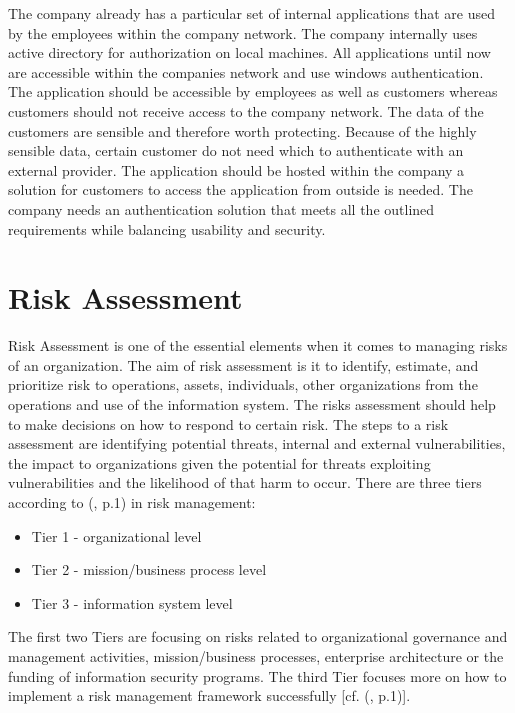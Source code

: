 The company already has a particular set of internal applications that are used by the employees within the company network. The company internally uses active directory for authorization on local machines. All applications until now are accessible within the companies network and use windows authentication. The application should be accessible by employees as well as customers whereas customers should not receive access to the company network. The data of the customers are sensible and therefore worth protecting. Because of the highly sensible data, certain customer do not need which to authenticate with an external provider. The application should be hosted within the company a solution for customers to access the application from outside is needed. The company needs an authentication solution that meets all the outlined requirements while balancing usability and security. 


\section{Risk Assessment}

Risk Assessment is one of the essential elements when it comes to managing risks of an organization. The aim of risk assessment is it to identify, estimate, and prioritize risk to operations, assets, individuals, other organizations from the operations and use of the information system. The risks assessment should help to make decisions on how to respond to certain risk. The steps to a risk assessment are identifying potential threats, internal and external vulnerabilities, the impact to organizations given the potential for threats exploiting vulnerabilities and the likelihood of that harm to occur. There are three tiers according to (\cite{NIST:2012:GCRA}, p.1) in risk management:

\begin{itemize}
	\item Tier 1 - organizational level
	\item Tier 2 - mission/business process level
	\item Tier 3 - information system level
\end{itemize}

The first two Tiers are focusing on risks related to organizational governance and management activities, mission/business processes, enterprise architecture or the funding of information security programs. The third Tier focuses more on how to implement a risk management framework successfully [cf. (\cite{NIST:2012:GCRA}, p.1)]. 

